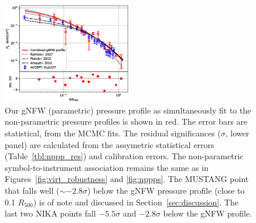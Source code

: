 \documentclass[twocolumn,traditabstract]{aa}
\begin{document}
\begin{figure}[!h]
  \centering
  \includegraphics[width=0.5\textwidth]{NIKA_ml_deproj_figs/Real_Joint_gNFW_Power_Real_11011111_2500S_500B_100W_gNFW_pressure_w_NP_pts_v2_p16cosmo_v2.eps}
  \caption{Our gNFW (parametric) pressure profile as simultaneously fit to the non-parametric pressure profiles is shown in red.
    The error bars are statistical, from the MCMC fits. The residual significances ($\sigma$, lower panel) are calculated from the
    assymetric statistical errors (Table~\ref{tbl:nppp_res}) and calibration errors.
    The non-parametric symbol-to-instrument association remains the same as in Figures~\ref{fig:virt_robustness} and \ref{fig:nppps}.
    The MUSTANG point that falls well ($\sim-2.8\sigma$) below the gNFW pressure profile (close to 0.1 $R_{500}$) is of
    note and discussed in Section~\ref{sec:discussion}. The last two NIKA points fall $-5.5\sigma$ and $-2.8\sigma$ below the gNFW
    profile.}
  \label{fig:joint_pressure}
\end{figure}

\end{document}
